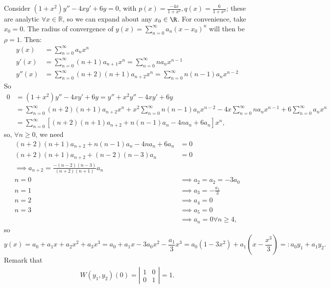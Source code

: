 \begin{example}
    Consider $(1 + x^2)y'' - 4xy' + 6y = 0$, with $p(x) = \frac{-4x}{1+x^2}, q(x) = \frac{6}{1+x^2}$; these are analytic $\forall x \in \mathbb{R}$, so we can expand about any $x_0 \in \R$. For convenience, take $x_0 = 0$. The radius of convergence of $y(x) = \sum_{n=0}^\infty a_n (x-x_0)^n$ will then be $\rho = 1$. Then:
    \begin{align*}
        y(x) &= \sum_{n=0}^\infty a_n x^n\\
        y'(x) &= \sum_{n=0}^\infty (n + 1)a_{n+1}x^n = \sum_{n=0}^\infty n a_nx^{n-1}\\
        y''(x) &= \sum_{n=0}^\infty (n + 2)(n+1)a_{n+2}x^n = \sum_{n=0}^\infty n(n-1)a_nx^{n-2}
    \end{align*}
    So \begin{align*}
        0 &= (1 + x^2)y'' - 4xy' + 6y = y'' + x^2 y'' - 4xy' + 6y\\ 
        &= \sum_{n=0}^\infty (n + 2)(n+1)a_{n+2}x^n + x^2\sum_{n=0}^\infty n(n-1)a_nx^{n-2} - 4x\sum_{n=0}^\infty n a_nx^{n-1} + 6\sum_{n=0}^\infty a_n x^n\\
        &= \sum_{n=0}^\infty \left[(n + 2)(n+1)a_{n+2} + n(n-1)a_n - 4n a_n + 6 a_n\right]x^n,
    \end{align*}
    so, $\forall n \geq 0$, we need \begin{align*}
        (n+2)(n+1)a_{n+2} + n(n-1)a_n - 4na_n + 6a_n &= 0\\
        (n+2)(n+1)a_{n+2} + (n-2)(n-3)a_n &= 0 \\
        \implies a_{n+2} = \frac{-(n-2)(n-3)}{(n+2)(n+1)}a_n\\
        n = 0 &\implies a_2 = a_2 = -3 a_0\\
        n = 1 &\implies a_3 = -\frac{a_1}{3}\\
        n = 2 &\implies a_4 = 0\\
        n = 3 &\implies a_5 = 0\\
        &\implies a_{n} = 0 \forall n \geq 4,
    \end{align*}
    so $$y(x) = a_0 + a_1x + a_2x^2 + a_3 x^3 = a_0 + a_1x -3a_0 x^2 - \frac{a_1}{3}x^3 = a_0(1 - 3x^2) + a_1(x - \frac{x^3}{3}) =: a_0 y_1 + a_1 y_2.$$ 
    Remark that \begin{align*}
        W(y_1, y_2)(0) = \left|\begin{matrix}
            1 & 0 \\
            0 & 1
        \end{matrix}\right| = 1.
    \end{align*}
\end{example}
